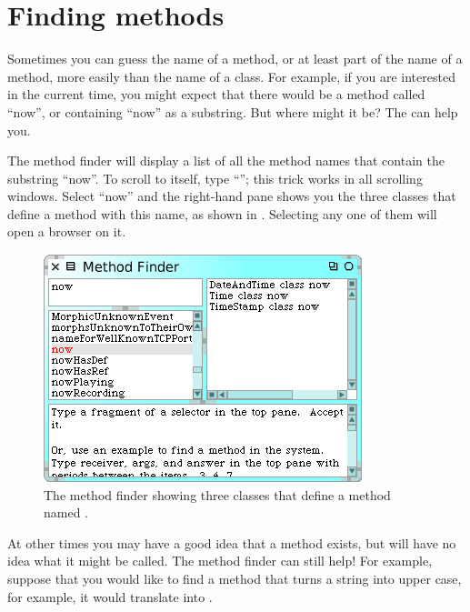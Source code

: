 \documentclass[a4paper,10pt,twoside]{book}
\begin{document}
\section{Finding methods}
\label{sec:quick:methodFinder}

Sometimes you can guess the name of a method, or at least part of the name of a method, more easily than the name of a class.  For example, if you are interested in the current time, you might expect that there would be a method called ``now'', or containing ``now'' as a substring.   But where might it be?
The  can help you.

The method finder will display a list of all the method names that contain the substring ``now''.  
To scroll to  itself, type ``''; this trick works in all scrolling windows.  Select ``now'' and the right-hand pane shows you the three classes that define a method with this name, as shown in .  Selecting any one of them will open a browser on it.

\begin{figure}[hbt]
\centerline {\includegraphics[scale=0.7]{methodFinder-now}}
\caption{The method finder showing three classes that define a method named .
\label{fig:MethodFinder}}
\end{figure}

At other times you may have a good idea that a method exists, but will have no idea what it might be called.
The method finder can still help!  For example, suppose that you would like to find a method that turns a string into upper case, for example, it would translate  into .
\end{document}
